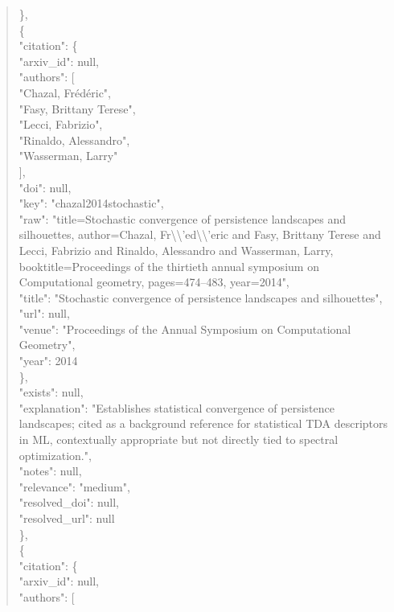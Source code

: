 \documentclass[11pt]{article}
\begin{document}
\begin{quote}
    \},\\
    \{\\
      "citation": \{\\
        "arxiv\_id": null,\\
        "authors": [\\
          "Chazal, Frédéric",\\
          "Fasy, Brittany Terese",\\
          "Lecci, Fabrizio",\\
          "Rinaldo, Alessandro",\\
          "Wasserman, Larry"\\
        ],\\
        "doi": null,\\
        "key": "chazal2014stochastic",\\
        "raw": "title=Stochastic convergence of persistence landscapes and silhouettes, author=Chazal, Fr\textbackslash{}\textbackslash{}'ed\textbackslash{}\textbackslash{}'eric and Fasy, Brittany Terese and Lecci, Fabrizio and Rinaldo, Alessandro and Wasserman, Larry, booktitle=Proceedings of the thirtieth annual symposium on Computational geometry, pages=474--483, year=2014",\\
        "title": "Stochastic convergence of persistence landscapes and silhouettes",\\
        "url": null,\\
        "venue": "Proceedings of the Annual Symposium on Computational Geometry",\\
        "year": 2014\\
      \},\\
      "exists": null,\\
      "explanation": "Establishes statistical convergence of persistence landscapes; cited as a background reference for statistical TDA descriptors in ML, contextually appropriate but not directly tied to spectral optimization.",\\
      "notes": null,\\
      "relevance": "medium",\\
      "resolved\_doi": null,\\
      "resolved\_url": null\\
    \},\\
    \{\\
      "citation": \{\\
        "arxiv\_id": null,\\
        "authors": [\\

\end{quote}
\end{document}
